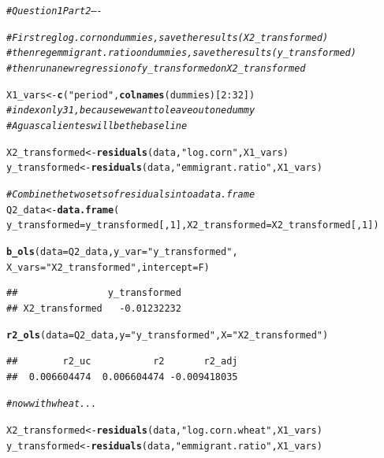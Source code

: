 \documentclass[english, 11pt]{article}\usepackage[]{graphicx}\usepackage[]{color}
\makeatletter
\newcommand{\hlnum}[1]{\textcolor[rgb]{0.686,0.059,0.569}{#1}}%
\newcommand{\hlstr}[1]{\textcolor[rgb]{0.192,0.494,0.8}{#1}}%
\newcommand{\hlcom}[1]{\textcolor[rgb]{0.678,0.584,0.686}{\textit{#1}}}%
\newcommand{\hlopt}[1]{\textcolor[rgb]{0,0,0}{#1}}%
\newcommand{\hlstd}[1]{\textcolor[rgb]{0.345,0.345,0.345}{#1}}%
\newcommand{\hlkwb}[1]{\textcolor[rgb]{0.69,0.353,0.396}{#1}}%
\newcommand{\hlkwc}[1]{\textcolor[rgb]{0.333,0.667,0.333}{#1}}%
\newcommand{\hlkwd}[1]{\textcolor[rgb]{0.737,0.353,0.396}{\textbf{#1}}}%
\newenvironment{kframe}{%
 \def\at@end@of@kframe{}%
 \ifinner\ifhmode%
  \def\at@end@of@kframe{\end{minipage}}%
  \begin{minipage}{\columnwidth}%
 \fi\fi%
 \def\FrameCommand##1{\hskip\@totalleftmargin \hskip-\fboxsep
 \colorbox{shadecolor}{##1}\hskip-\fboxsep
     \hskip-\linewidth \hskip-\@totalleftmargin \hskip\columnwidth}%
 \MakeFramed {\advance\hsize-\width
   \@totalleftmargin\z@ \linewidth\hsize
   \@setminipage}}%
 {\par\unskip\endMakeFramed%
 \at@end@of@kframe}
\newenvironment{knitrout}{}{} %
\makeatother
\begin{document}
\begin{knitrout}\footnotesize
{}\color{fgcolor}\begin{kframe}
\begin{alltt}
\hlcom{# Question 1 Part 2 ----}

\hlcom{# First reg log.corn on dummies, save the results (X2_transformed)}
\hlcom{# then reg emmigrant.ratio on dummies, save the results (y_transformed)}
\hlcom{# then run a new regression of y_transformed on X2_transformed}

\hlstd{X1_vars}\hlkwb{<-}\hlkwd{c}\hlstd{(}\hlstr{"period"}\hlstd{,} \hlkwd{colnames}\hlstd{(dummies)[}\hlnum{2}\hlopt{:}\hlnum{32}\hlstd{])}
\hlcom{#   index only 31, because we want to leave out one dummy}
\hlcom{#   Aguascalientes will be the baseline }

\hlstd{X2_transformed} \hlkwb{<-} \hlkwd{residuals}\hlstd{(data,} \hlstr{"log.corn"}\hlstd{, X1_vars)}
\hlstd{y_transformed} \hlkwb{<-} \hlkwd{residuals}\hlstd{(data,} \hlstr{"emmigrant.ratio"}\hlstd{, X1_vars)}

\hlcom{# Combine the two sets of residuals into a data.frame}
\hlstd{Q2_data} \hlkwb{<-} \hlkwd{data.frame}\hlstd{(}
  \hlkwc{y_transformed} \hlstd{= y_transformed[,}\hlnum{1}\hlstd{],} \hlkwc{X2_transformed} \hlstd{= X2_transformed[,}\hlnum{1}\hlstd{])}

\hlkwd{b_ols}\hlstd{(}\hlkwc{data} \hlstd{= Q2_data,} \hlkwc{y_var} \hlstd{=} \hlstr{"y_transformed"}\hlstd{,}
      \hlkwc{X_vars} \hlstd{=} \hlstr{"X2_transformed"}\hlstd{,} \hlkwc{intercept} \hlstd{= F)}
\end{alltt}
\begin{verbatim}
##                y_transformed
## X2_transformed   -0.01232232
\end{verbatim}
\begin{alltt}
\hlkwd{r2_ols}\hlstd{(}\hlkwc{data} \hlstd{= Q2_data,} \hlkwc{y} \hlstd{=} \hlstr{"y_transformed"}\hlstd{,} \hlkwc{X} \hlstd{=} \hlstr{"X2_transformed"}\hlstd{)}
\end{alltt}
\begin{verbatim}
##        r2_uc           r2       r2_adj 
##  0.006604474  0.006604474 -0.009418035
\end{verbatim}
\begin{alltt}
\hlcom{#now with wheat... }

\hlstd{X2_transformed} \hlkwb{<-} \hlkwd{residuals}\hlstd{(data,} \hlstr{"log.corn.wheat"}\hlstd{, X1_vars)}
\hlstd{y_transformed} \hlkwb{<-} \hlkwd{residuals}\hlstd{(data,} \hlstr{"emmigrant.ratio"}\hlstd{, X1_vars)}


\end{alltt}
\end{kframe}
\end{knitrout}
\end{document}
